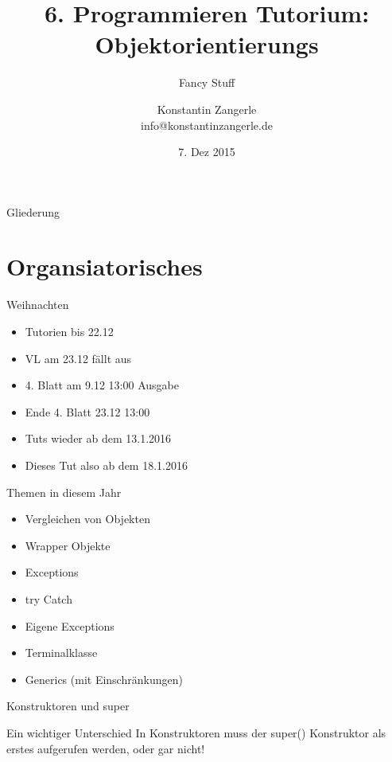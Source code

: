 \documentclass[18pt]{beamer}
\title[Programmieren Tutorium]{6. Programmieren Tutorium:\texorpdfstring{\\}{} Objektorientierungs}
\subtitle{Fancy Stuff}
\author{Konstantin Zangerle \texorpdfstring{\\}{} info@konstantinzangerle.de}
\date{7. Dez 2015}
\begin{document}

\begin{frame}
\titlepage
\end{frame}

\begin{frame}{Gliederung}
\tableofcontents
\end{frame}

\section{Organsiatorisches}

\begin{frame}{Weihnachten}
 \begin{itemize}
  \item Tutorien bis 22.12
  \item VL am 23.12 fällt aus
  \item 4. Blatt am 9.12 13:00 Ausgabe
  \item Ende 4. Blatt 23.12 13:00
  \item Tuts wieder ab dem 13.1.2016
  \item Dieses Tut also ab dem 18.1.2016
 \end{itemize}

\end{frame}

\begin{frame}{Themen in diesem Jahr}
\begin{itemize}
 \item Vergleichen von Objekten
 \item Wrapper Objekte
 \item Exceptions
 \item try Catch
 \item Eigene Exceptions
 \item Terminalklasse
 \item Generics (mit Einschränkungen)
\end{itemize}

 
\end{frame}



\begin{frame}{Konstruktoren und super}
 \begin{alertblock}{Ein wichtiger Unterschied}
  In Konstruktoren muss der super() Konstruktor als erstes aufgerufen werden,
  oder gar nicht!
 \end{alertblock}
\end{frame}
\end{document}
